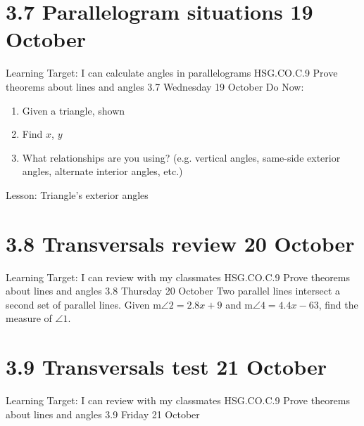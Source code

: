 \section{3.7 Parallelogram situations \hfill 19 October}
\begin{frame}{Learning Target: I can calculate angles in parallelograms}
  {HSG.CO.C.9 Prove theorems about lines and angles  \hfill \alert{3.7 Wednesday 19 October}}
  Do Now: 
  \begin{multicols}{2}
    \begin{enumerate}
      \item Given a triangle, shown
      \item Find $x$, $y$
      \item What relationships are you using? (e.g. vertical angles, same-side exterior angles, alternate interior angles, etc.)
    \end{enumerate}
  \end{multicols}
  Lesson: Triangle's exterior angles
\end{frame}

\section{3.8 Transversals review \hfill 20 October}
\begin{frame}{Learning Target: I can review with my classmates}
  {HSG.CO.C.9 Prove theorems about lines and angles \hfill \alert{3.8 Thursday 20 October}}
  Two parallel lines intersect a second set of parallel lines. Given m$\angle 2 = 2.8x+9$ and m$\angle 4 = 4.4x - 63$, find the measure of $\angle 1$. 
  \begin{flushright}
    \end{flushright}
\end{frame}

\section{3.9 Transversals test \hfill 21 October}
\begin{frame}{Learning Target: I can review with my classmates}
  {HSG.CO.C.9 Prove theorems about lines and angles \hfill \alert{3.9 Friday 21 October}}

\end{frame}


